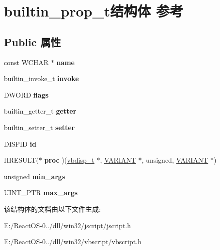 \hypertarget{structbuiltin__prop__t}{}\section{builtin\+\_\+prop\+\_\+t结构体 参考}
\label{structbuiltin__prop__t}
\subsection*{Public 属性}
\begin{DoxyCompactItemize}
\item 
\mbox{\label{structbuiltin__prop__t_a4d0f71948445ec3178445550be7331c4}} 
const W\+C\+H\+AR $\ast$ {\bfseries name}
\item 
\mbox{\label{structbuiltin__prop__t_ad8a03fe0b7a9aedada062a2975f6620f}} 
builtin\+\_\+invoke\+\_\+t {\bfseries invoke}
\item 
\mbox{\label{structbuiltin__prop__t_ad41b0a5cf7bb9f320443170a5a104341}} 
D\+W\+O\+RD {\bfseries flags}
\item 
\mbox{\label{structbuiltin__prop__t_a34dc2cd3cd27c8c15787287a952a2ae9}} 
builtin\+\_\+getter\+\_\+t {\bfseries getter}
\item 
\mbox{\label{structbuiltin__prop__t_a63266c052ee5e2e58b979da59865b55a}} 
builtin\+\_\+setter\+\_\+t {\bfseries setter}
\item 
\mbox{\label{structbuiltin__prop__t_ac884b36af9e57f4f7610829ecf71c5e7}} 
D\+I\+S\+P\+ID {\bfseries id}
\item 
\mbox{\label{structbuiltin__prop__t_ae5392c55554b22f4d0d8556b348cad67}} 
H\+R\+E\+S\+U\+LT($\ast$ {\bfseries proc} )(\hyperlink{struct__vbdisp__t}{vbdisp\+\_\+t} $\ast$, \hyperlink{structtag_v_a_r_i_a_n_t}{V\+A\+R\+I\+A\+NT} $\ast$, unsigned, \hyperlink{structtag_v_a_r_i_a_n_t}{V\+A\+R\+I\+A\+NT} $\ast$)
\item 
\mbox{\label{structbuiltin__prop__t_a11c25d0eb956e332725e05d0070dfab7}} 
unsigned {\bfseries min\+\_\+args}
\item 
\mbox{\label{structbuiltin__prop__t_a1d47319ba5ecbf61568ee9e8aedcd467}} 
U\+I\+N\+T\+\_\+\+P\+TR {\bfseries max\+\_\+args}
\end{DoxyCompactItemize}


该结构体的文档由以下文件生成\+:\begin{DoxyCompactItemize}
\item 
E\+:/\+React\+O\+S-\/0../dll/win32/jscript/jscript.\+h\item 
E\+:/\+React\+O\+S-\/0../dll/win32/vbscript/vbscript.\+h\end{DoxyCompactItemize}
